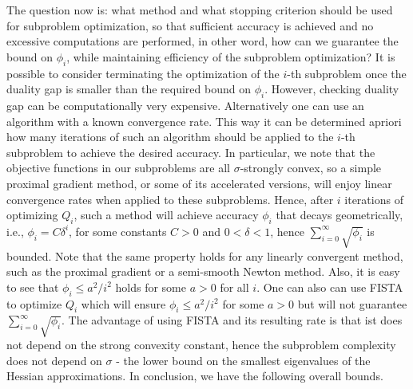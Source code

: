 \documentclass[11pt]{article}
\numberwithin{equation}{section}
\begin{document}
%
The question now is: what method and what stopping criterion should be used for subproblem optimization, so that sufficient accuracy is achieved 
and no excessive computations are performed, in other word, how can we guarantee the bound on $\phi_i$,  
while maintaining efficiency of the subproblem optimization? 
It is possible to consider terminating
 the optimization of the $i$-th subproblem once the duality gap is smaller than the required bound on $\phi_i$.  
 However, checking duality gap can be computationally  very expensive. 
 Alternatively one can use an algorithm with a known  convergence rate. 
 This way it can be determined apriori how many iterations of such an algorithm should be applied to the $i$-th subproblem to achieve the desired accuracy. In particular, we note that the objective functions in our subproblems  are all $\sigma$-strongly convex, so a simple proximal gradient method, or some of its accelerated versions,  will enjoy linear convergence rates when applied to these subproblems.  Hence, after $i$ iterations of optimizing
  $Q_i$,  such a method will achieve accuracy $\phi_i$ that decays geometrically, i.e., $\phi_i=C\delta^i$, for some constants $C>0$ and $0<\delta<1$, hence 
$\sum_{i=0}^{\infty} \sqrt{\phi_i}$ is  bounded.   Note that the same property holds for any linearly convergent  method, such as the proximal gradient or a semi-smooth Newton method. 
 Also, it is easy to see that $\phi_i\leq a^2/i^2$ holds for some $a>0$ for all $i$.   
One can also can use FISTA \cite{Beck2009} to optimize $Q_i$ which will ensure 
$\phi_i\leq a^2/i^2$ for some $a>0$ but will not guarantee $\sum_{i=0}^{\infty} \sqrt{\phi_i}$.
The advantage of using FISTA and its resulting rate is that ist does not depend on the strong convexity constant,
 hence the subproblem complexity does 
not depend on  $\sigma$ - the lower bound on the smallest eigenvalues of the Hessian approximations.
 In conclusion, we have the following overall bounds. 
\end{document}
